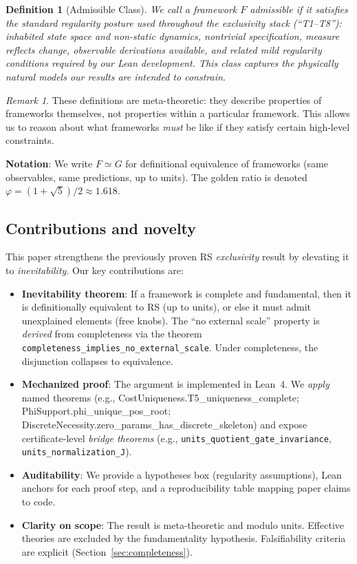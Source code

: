 \documentclass[12pt]{article}
\newtheorem{definition}[theorem]{Definition}
\theoremstyle{remark}
\newtheorem{remark}[theorem]{Remark}
\begin{document}
\begin{definition}[Admissible Class]\label{def:admissible}
We call a framework $F$ \emph{admissible} if it satisfies the standard regularity posture used throughout the exclusivity stack (``T1--T8''):
inhabited state space and non-static dynamics, nontrivial specification, measure reflects change, observable derivations available, and related mild regularity conditions required by our Lean development. This class captures the physically natural models our results are intended to constrain.
\end{definition}

\begin{remark}
These definitions are meta-theoretic: they describe properties of frameworks themselves, not properties within a particular framework. This allows us to reason about what frameworks \emph{must} be like if they satisfy certain high-level constraints.
\end{remark}

\vspace{1em}
\noindent\textbf{Notation}: We write $F \simeq G$ for definitional equivalence of frameworks (same observables, same predictions, up to units). The golden ratio is denoted $\varphi = (1+\sqrt{5})/2 \approx 1.618$.

\subsection{Contributions and novelty}
This paper strengthens the previously proven RS \emph{exclusivity} result by elevating it to \emph{inevitability}. Our key contributions are:
\begin{itemize}
  \item \textbf{Inevitability theorem}: If a framework is complete and fundamental, then it is definitionally equivalent to RS (up to units), or else it must admit unexplained elements (free knobs). The ``no external scale'' property is \emph{derived} from completeness via the theorem \texttt{completeness\_implies\_no\_external\_scale}. Under completeness, the disjunction collapses to equivalence.
  \item \textbf{Mechanized proof}: The argument is implemented in Lean~4. We \emph{apply} named theorems (e.g., CostUniqueness.T5\_uniqueness\_complete; PhiSupport.phi\_unique\_pos\_root; DiscreteNecessity.zero\_params\_has\_discrete\_skeleton) and expose certificate-level \emph{bridge theorems} (e.g., \texttt{units\_quotient\_gate\_invariance}, \texttt{units\_normalization\_J}).
  \item \textbf{Auditability}: We provide a hypotheses box (regularity assumptions), Lean anchors for each proof step, and a reproducibility table mapping paper claims to code.
  \item \textbf{Clarity on scope}: The result is meta-theoretic and modulo units. Effective theories are excluded by the fundamentality hypothesis. Falsifiability criteria are explicit (Section~\ref{sec:completeness}).
\end{itemize}
\end{document}
